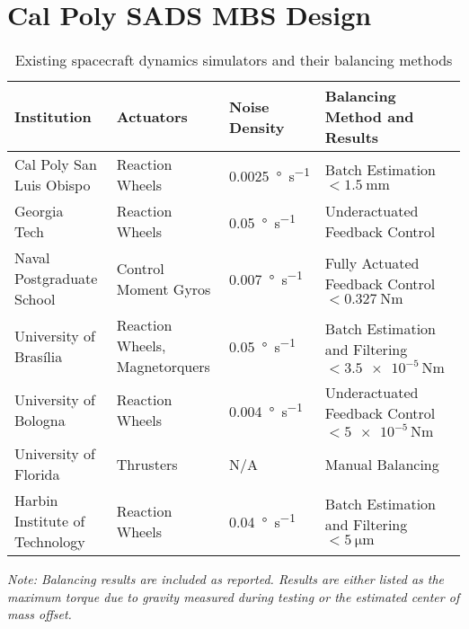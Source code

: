 \section{Cal Poly SADS MBS Design }
\begin{table}[!ht]
\caption{Existing spacecraft dynamics simulators and their balancing methods}\label{table:existing_testbeds}
\centering
\renewcommand{\arraystretch}{1.3}

\begin{tabularx}{\textwidth}{
    >{\raggedright\arraybackslash}p{3cm}   %
    >{\raggedright\arraybackslash}p{3.5cm} %
    >{\raggedright\arraybackslash}p{2.2cm} %
    >{\raggedright\arraybackslash}X}       %
\toprule
\textbf{Institution} & \textbf{Actuators} & \textbf{Noise Density} & \textbf{Balancing Method and Results} \\
\midrule
Cal Poly San Luis Obispo~\cite{dam_applied_2014} & 
Reaction Wheels & 
\SI{0.0025}{\degree\per\second} & 
Batch Estimation \newline $<\SI{1.5}{\milli\metre}$ \\
\addlinespace[0.75em]

Georgia Tech~\cite{choi_automatic_2016} & 
Reaction Wheels & 
\SI{0.05}{\degree\per\second} & 
Underactuated Feedback Control \\
\addlinespace[0.75em]
Naval Postgraduate School~\cite{kim_system_2006} & 
Control Moment Gyros & 
\SI{0.007}{\degree\per\second} & 
Fully Actuated Feedback Control \newline $<\SI{0.327}{\newton\metre}$ \\
\addlinespace[0.75em]
University of Brasília~\cite{silva_filtering_2018} & 
Reaction Wheels, Magnetorquers & 
\SI{0.05}{\degree\per\second} & 
Batch Estimation and Filtering \newline $<\num{3.5e-5}\,\si{\newton\metre}$ \\
\addlinespace[0.75em]
University of Bologna~\cite{modenini2020dynamic} & 
Reaction Wheels & 
\SI{0.004}{\degree\per\second} & 
Underactuated Feedback Control \newline $<\num{5e-5}\,\si{\newton\metre}$ \\
\addlinespace[0.75em]
University of Florida~\cite{saulnier2014six} & 
Thrusters & 
N/A & 
Manual Balancing \\
\addlinespace[0.75em]
Harbin Institute of Technology~\cite{xu_parameter_2015} & 
Reaction Wheels & 
\SI{0.04}{\degree\per\second} & 
Batch Estimation and Filtering \newline $<\SI{5}{\micro\metre}$ \\
\bottomrule
\end{tabularx}

\vspace{0.5em}
\raggedright\footnotesize
\textit{Note: Balancing results are included as reported. Results are either listed as the maximum torque due to gravity measured during testing or the estimated center of mass offset.}
\end{table}
